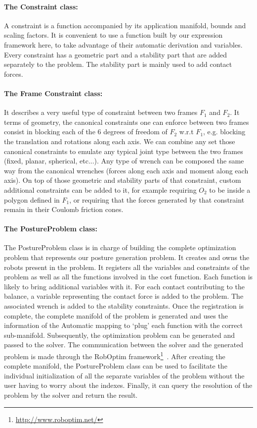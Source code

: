 \paragraph{The Constraint class:}
A constraint is a function accompanied by its application manifold, bounds and scaling factors.
It is convenient to use a function built by our expression framework here, to take advantage of their automatic derivation and variables.
Every constraint has a geometric part and a stability part that are added separately to the problem.
The stability part is mainly used to add contact forces.

\paragraph{The Frame Constraint class:}
It describes a very useful type of constraint between two frames $F_1$ and $F_2$.
It terms of geometry, the canonical constraints one can enforce between two frames consist in blocking each of the 6 degrees of freedom of $F_2$ w.r.t $F_1$, e.g. blocking the translation and rotations along each axis.
We can combine any set those canonical constraints to emulate any typical joint type between the two frames (fixed, planar, spherical, etc...).
Any type of wrench can be composed the same way from the canonical wrenches (forces along each axis and moment along each axis).
On top of those geometric and stability parts of that constraint, custom additional constraints can be added to it, for example requiring $O_2$ to be inside a polygon defined in $F_1$, or requiring that the forces generated by that constraint remain in their Coulomb friction cones.

\paragraph{The PostureProblem class:}
The PostureProblem class is in charge of building the complete optimization problem that represents our posture generation problem.
It creates and owns the robots present in the problem.
It registers all the variables and constraints of the problem as well as all the functions involved in the cost function.
Each function is likely to bring additional variables with it.
For each contact contributing to the balance, a variable representing the contact force is added to the problem.
The associated wrench is added to the stability constraints.
Once the registration is complete, the complete manifold of the problem is generated and uses the information of the Automatic mapping to `plug' each function with the correct sub-manifold.
Subsequently, the optimization problem can be generated and passed to the solver.
The communication between the solver and the generated problem is made through the RobOptim framework\footnote{\url{http://www.roboptim.net/}}~\cite{moulard:jsme:2013, moulard:jrsj:2014}.
After creating the complete manifold, the PostureProblem class can be used to facilitate the individual initialization of all the separate variables of the problem without the user having to worry about the indexes.
Finally, it can query the resolution of the problem by the solver and return the result.


